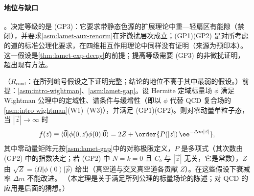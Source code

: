 \paragraph{地位与缺口}
\tagC。决定等级的是 (GP3)：它要求带静态色源的扩展理论中重—轻扇区有能隙（禁闭），并要求\cref{asm:lamet-aux-renorm}在非微扰层次成立；(GP1)(GP2) 是对所考虑的道的标准公理化要求，在四维相互作用理论中同样没有证明（来源\cite[第~5~节]{Ji:2026vir}为预印本）。这一假设是\cref{thm:lamet-exp-decay}的前提；提高等级需要 (GP3) 的非微扰证明，超出现有方法。

\begin{theorem}\label{thm:lamet-exp-decay}
（$R_{\mathrm{cond}}$：在所列编号假设之下证明完整；结论的地位不高于其中最弱的假设。）前提：\cref{asm:intro-wightman}、\cref{asm:lamet-gap}。设 Hermite 定域标量场 $\phi$ 满足 Wightman 公理中的定域性、谱条件与缓增性（即以 $\phi$ 代替 QCD 复合场的\cref{asm:intro-wightman}(W1)--(W3)），并满足 (GP1)(GP2)。则对零动量单粒子态，当 $|\vec z|\to\infty$ 时
\begin{equation}\label{eq:lamet-expdecay}
f(\vec z)\equiv\langle\vec 0|\phi(0,\vec z)\phi(0)|\vec 0\rangle=2Z+\order{P(|\vec z|)\,\ee^{-\Delta m|\vec z|}},
\end{equation}%
其中零动量矩阵元按\cref{asm:lamet-gap}中的对称极限定义，$P$ 是多项式（其次数由 (GP2) 中的指数决定；若 (GP2) 中 $N=k=0$ 且 $C_b$ 与 $|\vec z|$ 无关，它是常数），$Z$ 由 $\sqrt Z=\langle\Omega|\phi(0)|\vec p\rangle$ 给出（真空道与交叉真空道各贡献 $Z$）。在这些假设下衰减率 $\Delta m$ 不能改进。
（本定理是关于满足所列公理的标量场论的陈述；对 QCD 的应用是后面的猜想。）
\end{theorem}


